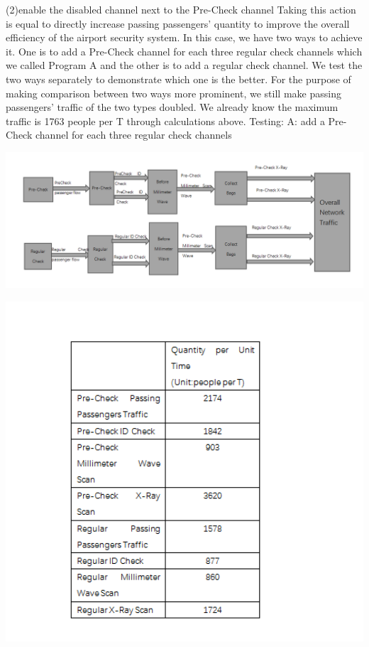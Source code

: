 \documentclass[12pt]{article}
\begin{document}
(2)enable the disabled channel next to the Pre-Check channel
Taking this action is equal to directly increase passing passengers’ quantity to improve the overall efficiency of the airport security system. In this case, we have two ways to achieve it.
One is to add a Pre-Check channel for each three regular check channels which we called Program A and the other is to add a regular check channel. We test the two ways separately to demonstrate which one is the better.
For the purpose of making comparison between two ways more prominent, we still make passing passengers’ traffic of the two types doubled.
We already know the maximum traffic is 1763 people per T through calculations above.
Testing:
 A: add a Pre-Check channel for each three regular check channels

\includegraphics[width=14cm]{m3.png}

\includegraphics[width=15cm]{p4.png}
\end{document}
